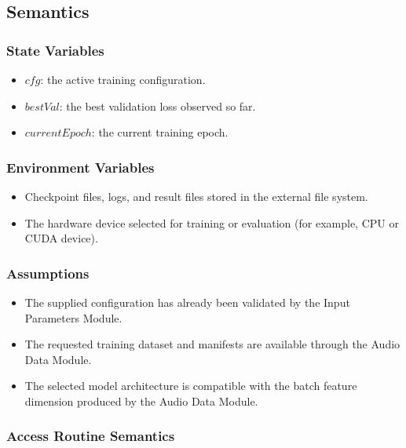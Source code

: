 \documentclass[12pt, titlepage]{article}
\begin{document}
\subsection{Semantics}

\subsubsection{State Variables}

\begin{itemize}
    \item $cfg$: the active training configuration.
    \item $bestVal$: the best validation loss observed so far.
    \item $currentEpoch$: the current training epoch.
\end{itemize}

\subsubsection{Environment Variables}

\begin{itemize}
    \item Checkpoint files, logs, and result files stored in the external file system.
    \item The hardware device selected for training or evaluation (for example, CPU or CUDA device).
\end{itemize}

\subsubsection{Assumptions}

\begin{itemize}
    \item The supplied configuration has already been validated by the Input Parameters Module.
    \item The requested training dataset and manifests are available through the Audio Data Module.
    \item The selected model architecture is compatible with the batch feature dimension produced by the Audio Data Module.
\end{itemize}

\subsubsection{Access Routine Semantics}
\end{document}
